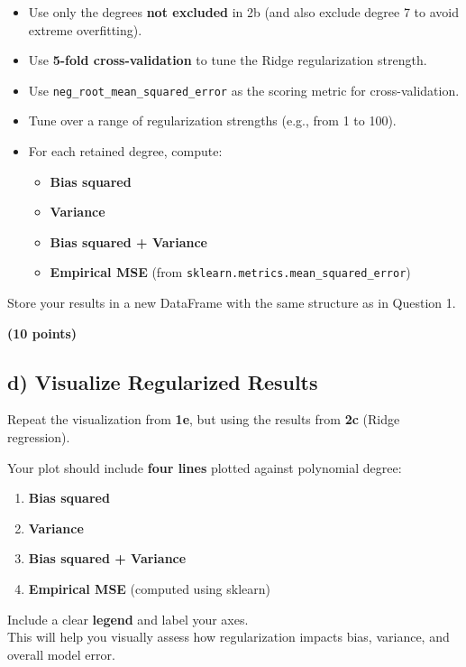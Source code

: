 \documentclass[
  letterpaper,
  DIV=11,
  numbers=noendperiod]{scrreprt}
\providecommand{\tightlist}{%
  \setlength{\itemsep}{0pt}\setlength{\parskip}{0pt}}\usepackage{longtable,booktabs,array}
\begin{document}
\begin{itemize}
\tightlist
\item
  Use only the degrees \textbf{not excluded} in 2b (and also exclude
  degree 7 to avoid extreme overfitting).
\item
  Use \textbf{5-fold cross-validation} to tune the Ridge regularization
  strength.
\item
  Use \texttt{neg\_root\_mean\_squared\_error} as the scoring metric for
  cross-validation.
\item
  Tune over a range of regularization strengths (e.g., from 1 to 100).
\item
  For each retained degree, compute:

  \begin{itemize}
  \tightlist
  \item
    \textbf{Bias squared}
  \item
    \textbf{Variance}
  \item
    \textbf{Bias squared + Variance}
  \item
    \textbf{Empirical MSE} (from
    \texttt{sklearn.metrics.mean\_squared\_error})
  \end{itemize}
\end{itemize}

Store your results in a new DataFrame with the same structure as in
Question 1.

\textbf{(10 points)}

\subsection{d) Visualize Regularized
Results}\label{d-visualize-regularized-results}

Repeat the visualization from \textbf{1e}, but using the results from
\textbf{2c} (Ridge regression).

Your plot should include \textbf{four lines} plotted against polynomial
degree:

\begin{enumerate}
\def\labelenumi{\arabic{enumi}.}
\tightlist
\item
  \textbf{Bias squared}
\item
  \textbf{Variance}
\item
  \textbf{Bias squared + Variance}
\item
  \textbf{Empirical MSE} (computed using sklearn)
\end{enumerate}

Include a clear \textbf{legend} and label your axes.\\
This will help you visually assess how regularization impacts bias,
variance, and overall model error.
\end{document}
